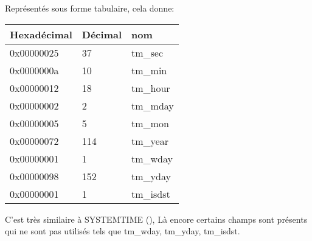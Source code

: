Représentés sous forme tabulaire, cela donne:

\begin{center}
\begin{tabular}{ | l | l | l | }
\hline
\headercolor{} Hexadécimal & 
\headercolor{} Décimal & 
\headercolor{} nom \\
\hline
0x00000025 & 37 	& tm\_sec \\
\hline
0x0000000a & 10 	& tm\_min \\
\hline
0x00000012 & 18 	& tm\_hour \\	
\hline
0x00000002 & 2 		& tm\_mday \\	
\hline
0x00000005 & 5 		& tm\_mon \\	
\hline
0x00000072 & 114 	& tm\_year \\
\hline
0x00000001 & 1 		& tm\_wday \\	
\hline
0x00000098 & 152 	& tm\_yday \\	
\hline
0x00000001 & 1 		& tm\_isdst \\
\hline
\end{tabular}
\end{center}

C'est très similaire à SYSTEMTIME (), 
Là encore certains champs sont présents qui ne sont pas utilisés tels que tm\_wday, tm\_yday, 
tm\_isdst.
